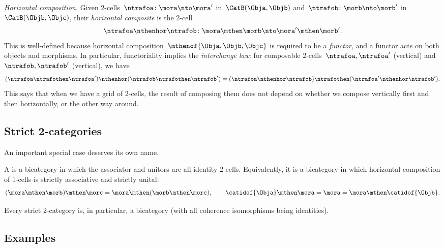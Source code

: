\emph{Horizontal composition.}
Given 2-cells~$\ntrafoa \colon \mora \nto \mora'$ in~$\CatB(\Obja, \Objb)$ and~$\ntrafob \colon \morb \nto \morb'$ in~$\CatB(\Objb, \Objc)$, their \emph{horizontal composite} is the 2-cell
\begin{equation}
    \ntrafoa \nthenhor \ntrafob \colon \mora \mthen \morb \nto \mora' \mthen \morb'.
\end{equation}
This is well-defined because horizontal composition~$\mthenof{\Obja,\Objb,\Objc}$ is required to be a \emph{functor}, and a functor acts on both objects and morphisms.
In particular, functoriality implies the \emph{interchange law}: for composable 2-cells~$\ntrafoa, \ntrafoa'$ (vertical) and~$\ntrafob, \ntrafob'$ (vertical), we have
\begin{equation}\label{eq:bicat-interchange}
    (\ntrafoa \ntrafothen \ntrafoa') \nthenhor (\ntrafob \ntrafothen \ntrafob') = (\ntrafoa \nthenhor \ntrafob) \ntrafothen (\ntrafoa' \nthenhor \ntrafob').
\end{equation}
This says that when we have a grid of 2-cells, the result of composing them does not depend on whether we compose vertically first and then horizontally, or the other way around.

\subsection{Strict 2-categories}
\label{sec:strict-2cat}

An important special case deserves its own name.

\begin{ctdefinition}
    \label{def:strict-2-category}
    A  is a bicategory in which the associator and unitors are all identity 2-cells.
    Equivalently, it is a bicategory in which horizontal composition of 1-cells is strictly associative and strictly unital:
    \begin{equation}\label{eq:strict-2cat-assoc}
        (\mora \mthen \morb) \mthen \morc = \mora \mthen (\morb \mthen \morc), \qquad \catidof{\Obja} \mthen \mora = \mora = \mora \mthen \catidof{\Objb}.
    \end{equation}
\end{ctdefinition}

Every strict 2-category is, in particular, a bicategory (with all coherence isomorphisms being identities).


\subsection{Examples}
\label{sec:bicat-examples}

